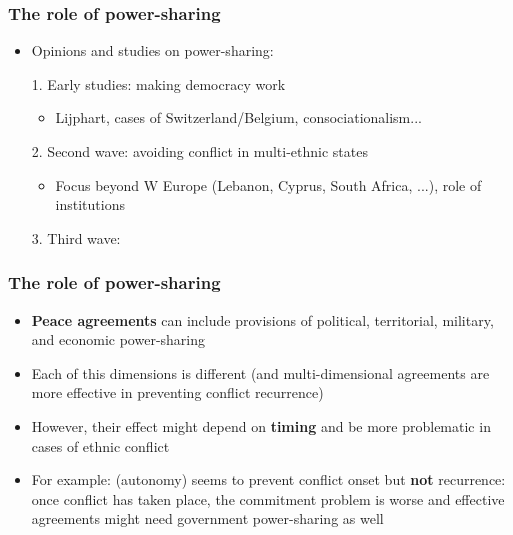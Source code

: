 \documentclass[aspectratio=43]{beamer}
\begin{document}
\begin{frame}
\frametitle{The role of power-sharing}
\centering

\begin{itemize}[<+->]
  \item Opinions and studies on power-sharing:
  \item[1.] Early studies: making democracy work
    \begin{itemize}
      \item Lijphart, cases of Switzerland/Belgium, consociationalism...
    \end{itemize}
  \item[2.] Second wave: avoiding conflict in multi-ethnic states
  \begin{itemize}
    \item Focus beyond W Europe (Lebanon, Cyprus, South Africa, ...), role of institutions
  \end{itemize}
  \item[3.] Third wave: 
\end{itemize}

\end{frame}

\begin{frame}
\frametitle{The role of power-sharing}
\centering

\begin{itemize}
  \item \textbf{Peace agreements} can include provisions of political, territorial, military, and economic power-sharing
  \item<2-> Each of this dimensions is different (and multi-dimensional agreements are more effective in preventing conflict recurrence)
  \item<3-> However, their effect might depend on \textbf{timing} and be more problematic in cases of ethnic conflict
  \item<4-> For example:  (autonomy) seems to prevent conflict onset but \textbf{not} recurrence: once conflict has taken place, the commitment problem is worse and effective agreements might need government power-sharing as well
\end{itemize}

\end{frame}
\end{document}
